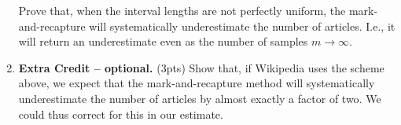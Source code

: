 \documentclass[10pt]{article}
\begin{document}
\begin{enumerate}
Prove that, when the interval lengths are not perfectly uniform, the mark-and-recapture will systematically underestimate the number of articles. I.e., it will return an underestimate even as the number of samples $m \rightarrow \infty$.

\item \textbf{Extra Credit -- optional.} (3pts) Show that, if Wikipedia uses the scheme above, we expect that the mark-and-recapture method will systematically underestimate the number of articles by almost exactly a factor of two. We could thus correct for this in our estimate. 

\end{enumerate}


%
\end{document}
